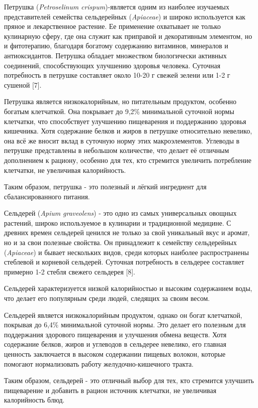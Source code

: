 \begin{multicols}{2}
Петрушка (\emph{Petroselinum crispum})-является одним из наиболее
изучаемых представителей семейства сельдерейных (\emph{Apiaceae}) и
широко используется как пряное и лекарственное растение. Ее применение
охватывает не только кулинарную сферу, где она служит как приправой и
декоративным элементом, но и фитотерапию, благодаря богатому содержанию
витаминов, минералов и антиоксидантов. Петрушка обладает множеством
биологически активных соединений, способствующих улучшению здоровья
человека. Суточная потребность в петрушке составляет около 10-20 г
свежей зелени или 1-2 г сушеной {[}7{]}.

Петрушка является низкокалорийным, но питательным продуктом, особенно
богатым клетчаткой. Она покрывает до 9,2\% минимальной суточной нормы
клетчатки, что способствует улучшению пищеварения и поддержанию здоровья
кишечника. Хотя содержание белков и жиров в петрушке относительно
невелико, она всё же вносит вклад в суточную норму этих макроэлементов.
Углеводы в петрушке представлены в небольшом количестве, что делает её
отличным дополнением к рациону, особенно для тех, кто стремится
увеличить потребление клетчатки, не увеличивая калорийность.

Таким образом, петрушка - это полезный и лёгкий ингредиент для
сбалансированного питания.

Сельдерей (\emph{Apium graveolens}) - это одно из самых универсальных
овощных растений, широко используемое в кулинарии и традиционной
медицине. С древних времен сельдерей ценился не только за свой
уникальный вкус и аромат, но и за свои полезные свойства. Он принадлежит
к семейству сельдерейных (\emph{Apiaceae}) и бывает нескольких видов,
среди которых наиболее распространены стеблевой и корневой сельдерей.
Суточная потребность в сельдерее составляет примерно 1-2 стебля свежего
сельдерея {[}8{]}.

Сельдерей характеризуется низкой калорийностью и высоким содержанием
воды, что делает его популярным среди людей, следящих за своим весом.

Сельдерей является низкокалорийным продуктом, однако он богат
клетчаткой, покрывая до 6,4\% минимальной суточной нормы. Это делает его
полезным для поддержания здорового пищеварения и улучшения обмена
веществ. Хотя содержание белков, жиров и углеводов в сельдерее невелико,
его главная ценность заключается в высоком содержании пищевых волокон,
которые помогают нормализовать работу желудочно-кишечного тракта.

Таким образом, сельдерей - это отличный выбор для тех, кто стремится
улучшить пищеварение и добавить в рацион источник клетчатки, не
увеличивая калорийность блюд.


\end{multicols}
